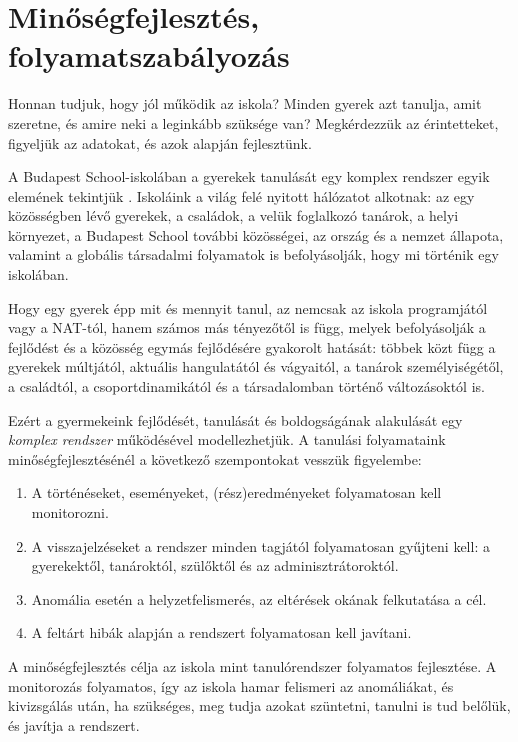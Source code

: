 \hypertarget{minosegfejlesztes-folyamatszabalyozas}{%
\section{Minőségfejlesztés,
folyamatszabályozás}\label{minosegfejlesztes-folyamatszabalyozas}}

Honnan tudjuk, hogy jól működik az iskola? Minden gyerek azt tanulja,
amit szeretne, és amire neki a leginkább szüksége van? Megkérdezzük az
érintetteket, figyeljük az adatokat, és azok alapján fejlesztünk.

A Budapest School-iskolában a gyerekek tanulását egy komplex rendszer
egyik elemének tekintjük {\autocite{Barabasi2007}}. Iskoláink a
világ felé nyitott hálózatot alkotnak: az egy közösségben lévő gyerekek,
a családok, a velük foglalkozó tanárok, a helyi környezet, a Budapest
School további közösségei, az ország és a nemzet állapota, valamint a
globális társadalmi folyamatok is befolyásolják, hogy mi történik egy
iskolában.

Hogy egy gyerek épp mit és mennyit tanul, az nemcsak az iskola programjától
vagy a NAT-tól, hanem számos más tényezőtől is függ, melyek
befolyásolják a fejlődést és a közösség egymás fejlődésére gyakorolt
hatását: többek közt függ a gyerekek múltjától, aktuális hangulatától és
vágyaitól, a tanárok személyiségétől, a családtól, a csoportdinamikától
és a társadalomban történő változásoktól is.

Ezért a gyermekeink fejlődését, tanulását és boldogságának alakulását
egy \emph{komplex rendszer} működésével modellezhetjük.
\newpage
A tanulási folyamataink minőségfejlesztésénél a következő szempontokat
vesszük figyelembe:

\begin{enumerate}
\def\labelenumi{\arabic{enumi}.}
\tightlist
\item
  A történéseket, eseményeket, (rész)eredményeket folyamatosan kell
  monitorozni.
\item
  A visszajelzéseket a rendszer minden tagjától folyamatosan gyűjteni
  kell: a gyerekektől, tanároktól, szülőktől és az adminisztrátoroktól.
\item
  Anomália esetén a helyzetfelismerés, az eltérések okának felkutatása a
  cél.
\item
  A feltárt hibák alapján a rendszert folyamatosan kell javítani.
\end{enumerate}

A minőségfejlesztés célja az iskola mint tanulórendszer folyamatos
fejlesztése. A monitorozás folyamatos, így az iskola hamar felismeri az
anomáliákat, és kivizsgálás után, ha szükséges, meg tudja azokat
szüntetni, tanulni is tud belőlük, és javítja a rendszert.

